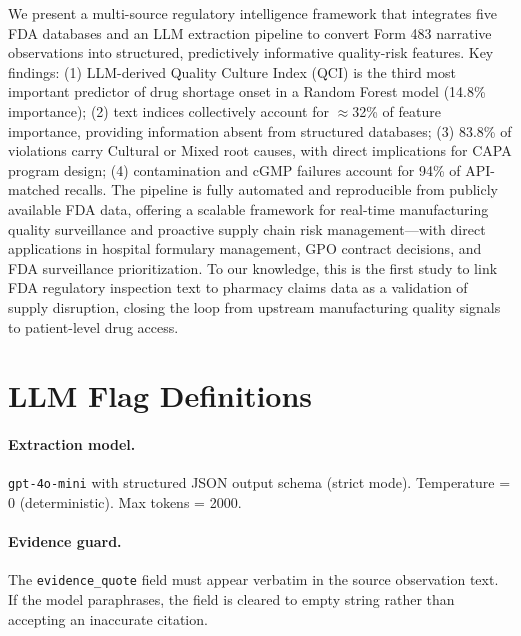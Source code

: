 \documentclass[12pt]{article}
\begin{document}
We present a multi-source regulatory intelligence framework that integrates
five FDA databases and an LLM extraction pipeline to convert Form 483
narrative observations into structured, predictively informative quality-risk
features.
Key findings: (1) LLM-derived Quality Culture Index (QCI) is the third most
important predictor of drug shortage onset in a Random Forest model (14.8\%
importance); (2) text indices collectively account for $\approx$32\% of
feature importance, providing information absent from structured databases;
(3) 83.8\% of violations carry Cultural or Mixed root causes, with direct
implications for CAPA program design; (4) contamination and cGMP failures
account for 94\% of API-matched recalls.
The pipeline is fully automated and reproducible from publicly available FDA
data, offering a scalable framework for real-time manufacturing quality
surveillance and proactive supply chain risk management---with direct
applications in hospital formulary management, GPO contract decisions, and
FDA surveillance prioritization.
To our knowledge, this is the first study to link FDA regulatory inspection
text to pharmacy claims data as a validation of supply disruption, closing
the loop from upstream manufacturing quality signals to patient-level drug
access.




\appendix

\section{LLM Flag Definitions}
\label{app:flags}

\paragraph{Extraction model.} \texttt{gpt-4o-mini} with structured JSON output
schema (strict mode). Temperature = 0 (deterministic). Max tokens = 2000.

\paragraph{Evidence guard.} The \texttt{evidence\_quote} field must appear
verbatim in the source observation text. If the model paraphrases, the field
is cleared to empty string rather than accepting an inaccurate citation.
\end{document}
